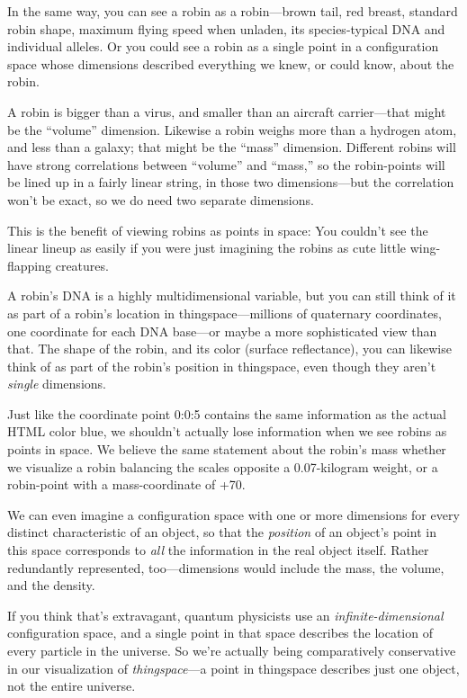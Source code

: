 {{{
 In the same way, you can see a robin as a robin---brown tail, red
breast, standard robin shape, maximum flying speed when unladen, its
species-typical DNA and individual alleles. Or you could see a robin as
a single point in a configuration space whose dimensions described
everything we knew, or could know, about the robin.}

{
 A robin is bigger than a virus, and smaller than an aircraft
carrier---that might be the
``volume'' dimension. Likewise a
robin weighs more than a hydrogen atom, and less than a galaxy; that
might be the ``mass'' dimension.
Different robins will have strong correlations between
``volume'' and
``mass,'' so the robin-points will
be lined up in a fairly linear string, in those two dimensions---but
the correlation won't be exact, so we do need two
separate dimensions.}

{
 This is the benefit of viewing robins as points in space: You
couldn't see the linear lineup as easily if you were
just imagining the robins as cute little wing-flapping creatures.}

{
 A robin's DNA is a highly multidimensional
variable, but you can still think of it as part of a
robin's location in thingspace---millions of quaternary
coordinates, one coordinate for each DNA base---or maybe a more
sophisticated view than that. The shape of the robin, and its color
(surface reflectance), you can likewise think of as part of the
robin's position in thingspace, even though they
aren't \textit{single} dimensions.}

{
 Just like the coordinate point 0:0:5 contains the same information
as the actual HTML color blue, we shouldn't actually
lose information when we see robins as points in space. We believe the
same statement about the robin's mass whether we
visualize a robin balancing the scales opposite a 0.07-kilogram weight,
or a robin-point with a mass-coordinate of +70.}

{
 We can even imagine a configuration space with one or more
dimensions for every distinct characteristic of an object, so that the
\textit{position} of an object's point in this space
corresponds to \textit{all} the information in the real object itself.
Rather redundantly represented, too---dimensions would include the
mass, the volume, and the density.}

{
 If you think that's extravagant, quantum
physicists use an \textit{infinite-dimensional} configuration space,
and a single point in that space describes the location of every
particle in the universe. So we're actually being
comparatively conservative in our visualization of
\textit{thingspace}{}---a point in thingspace describes just one
object, not the entire universe.}

}}
